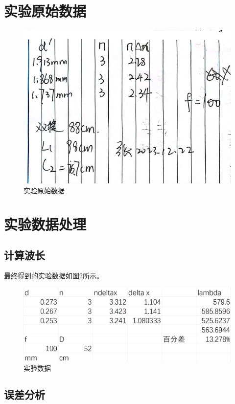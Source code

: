 \documentclass{ctexart}
\begin{document}
\section{实验原始数据}
\begin{figure}[H]
  \centering
  \includegraphics[height=0.5\textheight,width=1\textwidth]{yuanshishujv.jpg}
  \caption{实验原始数据}\label{yuanshishujv}
\end{figure}
\newpage

\section{实验数据处理}
  \subsection{计算波长}
  最终得到的实验数据如图\ref{shujv}所示。
  \begin{figure}[H]
    \centering
    \includegraphics[height=0.3\textheight,width=1\textwidth]{shujvchuli.png}
    \caption{实验数据}\label{shujv}
  \end{figure}
  \subsection{误差分析}
\end{document}
